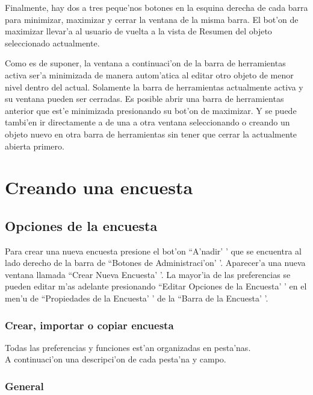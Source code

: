 \documentclass[12pt,spanish]{report}
\begin{document}
Finalmente, hay dos a tres peque'nos botones en la esquina derecha de cada barra  para minimizar, maximizar y cerrar la ventana de la misma barra. El bot'on de maximizar llevar'a al usuario de vuelta a la vista de Resumen del objeto seleccionado actualmente.

Como es de suponer, la ventana a continuaci'on de la barra de herramientas activa ser'a minimizada de manera autom'atica al editar otro objeto de menor nivel dentro del actual. Solamente la barra de herramientas actualmente activa y su ventana pueden ser cerradas. Es posible abrir una barra de herramientas anterior que est'e minimizada presionando su bot'on de maximizar. Y se puede tambi'en ir directamente a de una a otra ventana seleccionando o creando un objeto nuevo en otra barra de herramientas sin tener que cerrar la actualmente abierta primero.



\chapter{Creando una encuesta}
\newpage

\section {Opciones de la encuesta}
Para crear una nueva encuesta presione el bot'on ``A'nadir' ' que se encuentra al lado derecho de la barra de ``Botones de Administraci'on' '. Aparecer'a una nueva ventana llamada ``Crear Nueva Encuesta' '. La mayor'ia de las preferencias se pueden editar m'as adelante presionando ``Editar Opciones de la Encuesta' ' en el men'u de ``Propiedades de la Encuesta' ' de la ``Barra de la Encuesta' '.\\

\subsection {Crear, importar o copiar encuesta}

Todas las preferencias y funciones est'an organizadas en pesta'nas. \\
A continuaci'on una descripci'on de cada pesta'na y campo.

\subsection {General}
\end{document}
